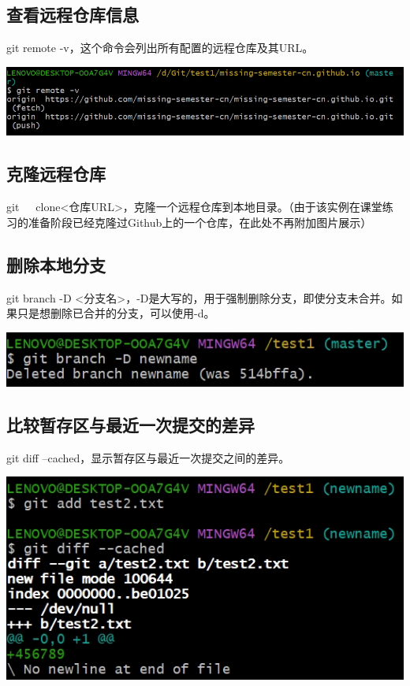 \documentclass[UTF8,a4paper]{ctexart}
\begin{document}
\begin{sloppypar}
	\subsection{查看远程仓库信息}
	git remote -v，这个命令会列出所有配置的远程仓库及其URL。
	
	\includegraphics[width = 16cm]{21}
	
	\subsection{克隆远程仓库}
	git~~~clone<仓库URL>，克隆一个远程仓库到本地目录。（由于该实例在课堂练习的准备阶段已经克隆过Github上的一个仓库，在此处不再附加图片展示）
	
	\subsection{删除本地分支}
	git branch -D <分支名>，-D是大写的，用于强制删除分支，即使分支未合并。如果只是想删除已合并的分支，可以使用-d。
	
	\includegraphics[width = 16cm]{23}
	
	\subsection{比较暂存区与最近一次提交的差异}
	git diff --cached，显示暂存区与最近一次提交之间的差异。
	
	\includegraphics[width = 16cm]{24}
	

\end{sloppypar}
\end{document}
